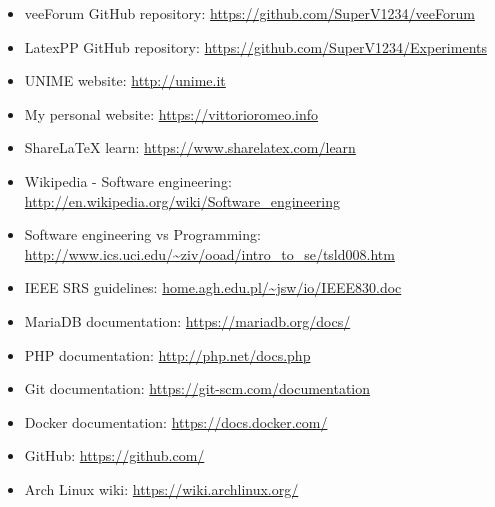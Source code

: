 \documentclass[12pt]{report}
\begin{document}
            \begin{itemize}
                \item veeForum GitHub repository: \url{https://github.com/SuperV1234/veeForum}
                \item LatexPP GitHub repository: \url{https://github.com/SuperV1234/Experiments}
                \item UNIME website: \url{http://unime.it}
                \item My personal website: \url{https://vittorioromeo.info}

                \item ShareLaTeX learn: \url{https://www.sharelatex.com/learn}
                \item Wikipedia - Software engineering: \url{http://en.wikipedia.org/wiki/Software_engineering}
                \item Software engineering vs Programming: \url{http://www.ics.uci.edu/~ziv/ooad/intro_to_se/tsld008.htm}
                \item IEEE SRS guidelines: \url{home.agh.edu.pl/~jsw/io/IEEE830.doc}
                \item MariaDB documentation: \url{https://mariadb.org/docs/}
                \item PHP documentation: \url{http://php.net/docs.php}
            
                \item Git documentation: \url{https://git-scm.com/documentation}
                \item Docker documentation: \url{https://docs.docker.com/}
                \item GitHub: \url{https://github.com/}
                \item Arch Linux wiki: \url{https://wiki.archlinux.org/}
            \end{itemize}
\end{document}
